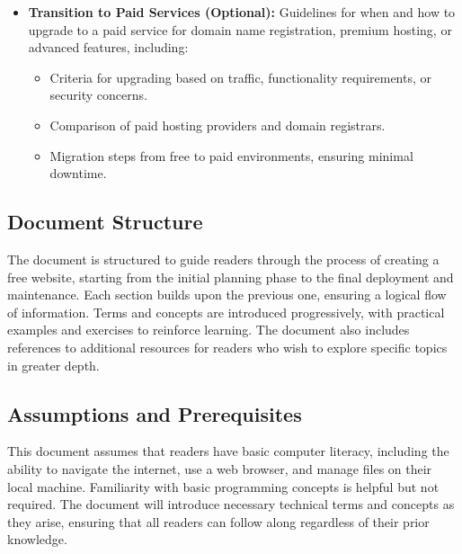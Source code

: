 \begin{itemize}
    \item \textbf{Transition to Paid Services (Optional):} Guidelines for when and how to upgrade to a paid service for domain name registration, premium hosting, or advanced features, including:
    \begin{itemize}
        \item Criteria for upgrading based on traffic, functionality requirements, or security concerns.
        \item Comparison of paid hosting providers and domain registrars.
        \item Migration steps from free to paid environments, ensuring minimal downtime.
    \end{itemize}
\end{itemize}

\subsection{Document Structure}

The document is structured to guide readers through the process of creating a free website, starting from the initial planning phase to the final deployment and maintenance. Each section builds upon the previous one, ensuring a logical flow of information. Terms and concepts are introduced progressively, with practical examples and exercises to reinforce learning. The document also includes references to additional resources for readers who wish to explore specific topics in greater depth.

\subsection{Assumptions and Prerequisites}

This document assumes that readers have basic computer literacy, including the ability to navigate the internet, use a web browser, and manage files on their local machine. Familiarity with basic programming concepts is helpful but not required. The document will introduce necessary technical terms and concepts as they arise, ensuring that all readers can follow along regardless of their prior knowledge. %
